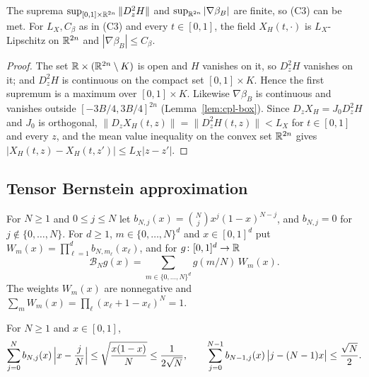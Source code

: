 \begin{lemma}\label{lem:cpl-lipschitz}
The suprema $\sup_{[0,1]\times\mathbb{R}^{2n}}\|D_z^2H\|$ and $\sup_{\mathbb{R}^{2n}}|\nabla\beta_B|$ are finite, so (C3) can be met.
For $L_X,C_\beta$ as in (C3) and every $t\in[0,1]$, the field $X_H(t,\cdot)$ is $L_X$-Lipschitz on $\mathbb{R}^{2n}$ and
$|\nabla\beta_B|\le C_\beta$.
\end{lemma}

\begin{proof}
The set $\mathbb{R}\times(\mathbb{R}^{2n}\setminus K)$ is open and $H$ vanishes on it, so $D_z^2H$ vanishes on it; and $D_z^2H$ is
continuous on the compact set $[0,1]\times K$. Hence the first supremum is a maximum over $[0,1]\times K$. Likewise
$\nabla\beta_B$ is continuous and vanishes outside $[-3B/4,3B/4]^{2n}$ (Lemma~\ref{lem:cpl-box}). Since
$D_zX_H=J_0D_z^2H$ and $J_0$ is orthogonal, $\|D_zX_H(t,z)\|=\|D_z^2H(t,z)\|<L_X$ for $t\in[0,1]$ and every $z$,
and the mean value inequality on the convex set $\mathbb{R}^{2n}$ gives $|X_H(t,z)-X_H(t,z')|\le L_X|z-z'|$.
\end{proof}

\subsection{Tensor Bernstein approximation}\label{sec:cpl-bernstein}

\begin{definition}\label{def:cpl-bernstein}
For $N\ge1$ and $0\le j\le N$ let $b_{N,j}(x)=\binom Njx^j(1-x)^{N-j}$, and $b_{N,j}=0$ for $j\notin\{0,\dots,N\}$. For
$d\ge1$, $m\in\{0,\dots,N\}^d$ and $x\in[0,1]^d$ put $W_m(x)=\prod_{\ell=1}^db_{N,m_\ell}(x_\ell)$, and for
$g\colon[0,1]^d\to\mathbb{R}$
\[
 \mathcal B_Ng(x)=\sum_{m\in\{0,\dots,N\}^d}g(m/N)\,W_m(x).
\]
The weights $W_m(x)$ are nonnegative and $\sum_mW_m(x)=\prod_\ell(x_\ell+1-x_\ell)^N=1$.
\end{definition}

\begin{lemma}\label{lem:cpl-mad}
For $N\ge1$ and $x\in[0,1]$,
\[
 \sum_{j=0}^Nb_{N,j}(x)\,\Bigl|x-\frac jN\Bigr|\le\sqrt{\frac{x(1-x)}N}\le\frac1{2\sqrt N},
 \qquad
 \sum_{j=0}^{N-1}b_{N-1,j}(x)\,\bigl|j-(N-1)x\bigr|\le\frac{\sqrt N}2 .
\]
\end{lemma}

